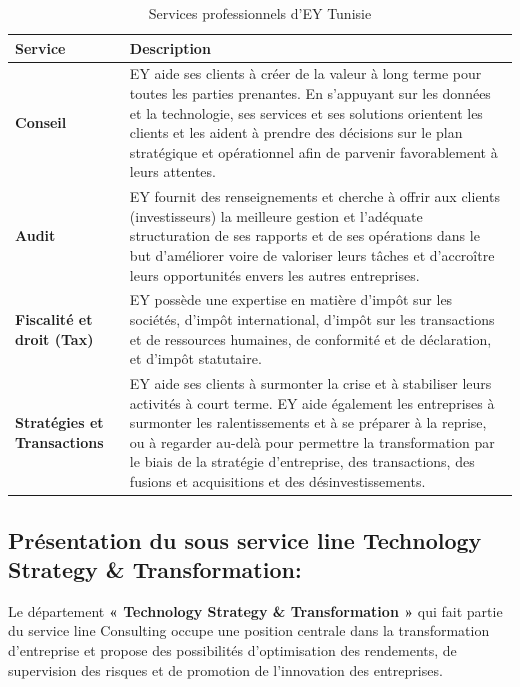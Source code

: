 \documentclass[a4paper, oneside, 12pt]{book}
\newcommand{\thead}[1]{\cellcolor{EYdark}\textcolor{white}{\textbf{#1}}}
\renewcommand{\thead}[1]{\cellcolor{EYyellow}\textcolor{EYdark}{\textbf{#1}}}
\begin{document}
\begin{table}[H]
\centering
\renewcommand{\arraystretch}{1.5}
\begin{tabularx}{\textwidth}{|p{2.5cm}|X|}
\hline
\thead{\textbf{Service}} & \textbf{\thead{Description}} \\
\hline
\textbf{Conseil} & EY aide ses clients à créer de la valeur à long terme pour toutes les parties prenantes. En s’appuyant sur les données et la technologie, ses services et ses solutions orientent les clients et les aident à prendre des décisions sur le plan stratégique et opérationnel afin de parvenir favorablement à leurs attentes. \\
\hline
\textbf{Audit} & EY fournit des renseignements et cherche à offrir aux clients (investisseurs) la meilleure gestion et l’adéquate structuration de ses rapports et de ses opérations dans le but d’améliorer voire de valoriser leurs tâches et d’accroître leurs opportunités envers les autres entreprises. \\
\hline
\textbf{Fiscalité et droit (Tax)} & EY possède une expertise en matière d’impôt sur les sociétés, d’impôt international, d’impôt sur les transactions et de ressources humaines, de conformité et de déclaration, et d’impôt statutaire. \\
\hline
\textbf{Stratégies et Transactions} & EY aide ses clients à surmonter la crise et à stabiliser leurs activités à court terme. EY aide également les entreprises à surmonter les ralentissements et à se préparer à la reprise, ou à regarder au-delà pour permettre la transformation par le biais de la stratégie d’entreprise, des transactions, des fusions et acquisitions et des désinvestissements. \\
\hline
\end{tabularx}
\caption{Services professionnels d’EY Tunisie}
\end{table}

\vspace{0.5cm}
\subsection{Présentation du sous service line Technology Strategy \& Transformation:}

\hspace{0.5cm}Le département \textbf{« Technology Strategy \& Transformation »} qui fait partie du service line Consulting occupe une position centrale dans la transformation d'entreprise et propose des possibilités d'optimisation des rendements, de supervision des risques et de promotion de l’innovation des entreprises.
\end{document}
